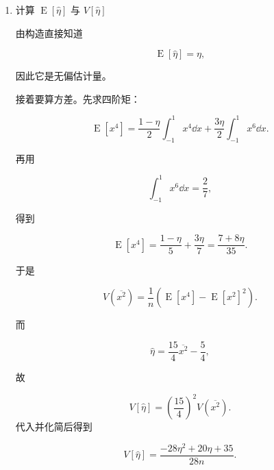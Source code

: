 \begin{question}
\begin{solution}
\begin{enumerate}
\[
\hat\eta = \frac{15\overline{x^2}-5}{4}.
\]

\item 计算 \(\operatorname{E}[\hat\eta]\) 与 \(V[\hat\eta]\)

由构造直接知道

\[
\operatorname{E}[\hat\eta]=\eta,
\]

因此它是无偏估计量。

接着要算方差。先求四阶矩：

\[
\operatorname{E}[x^4]=\frac{1-\eta}{2}\int_{-1}^1 x^4\dd{x} + \frac{3\eta}{2}\int_{-1}^1 x^6\dd{x}.
\]

再用

\[
\int_{-1}^1 x^6\dd{x}=\frac27,
\]

得到

\[
\operatorname{E}[x^4]=\frac{1-\eta}{5}+\frac{3\eta}{7}=\frac{7+8\eta}{35}.
\]

于是

\[
V(\overline{x^2})=\frac1n\left(\operatorname{E}[x^4]-\operatorname{E}[x^2]^2\right).
\]

而

\[
\hat\eta = \frac{15}{4}\overline{x^2}-\frac54,
\]

故

\[
V[\hat\eta]=\left(\frac{15}{4}\right)^2 V(\overline{x^2}).
\]
代入并化简后得到

\[
V[\hat\eta]=\frac{-28\eta^2+20\eta+35}{28n}.
\]
\end{enumerate}
\end{solution}
\end{question}


